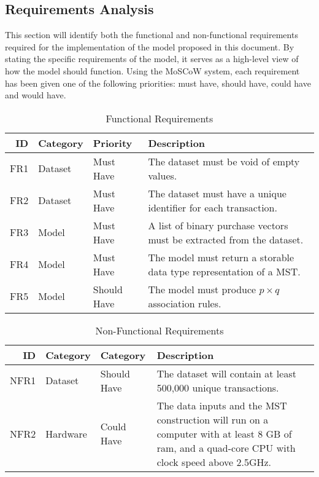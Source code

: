 \documentclass[a4paper,11pt]{article}
\begin{document}
\subsection{Requirements Analysis}
This section will identify both the functional and non-functional requirements required for the implementation of the model proposed in this document. By stating the specific requirements of the model,  it serves as a high-level view of how the model should function. 
 Using the MoSCoW system, each requirement has been given one of the following priorities: must have, should have, could have and would have.
\begin{table}[H]
\centering
\caption{Functional Requirements}
\begin{tabular}{@{}rlll@{}}
\toprule
\textbf{ID} & \textbf{Category} & \textbf{Priority} & \textbf{Description}                                                  \\ \midrule
FR1         & Dataset           & Must Have         & The dataset must be void of empty values.                             \\
FR2         & Dataset           & Must Have         & The dataset must have a unique identifier for each transaction.       \\
FR3         & Model             & Must Have         & A list of binary purchase vectors must be extracted from the dataset. \\
FR4         & Model             & Must Have         & The model must return a storable data type representation of a MST.   \\
FR5         & Model             & Should Have       & The model must produce  $p \times q$ association rules.               \\ \bottomrule
\end{tabular}
\label{tab:fr}
\end{table}

\begin{table}[H]
\centering
\caption{Non-Functional Requirements}
\begin{tabular}{@{}rllp{}@{}}
\toprule
\textbf{ID} & \textbf{Category} & \textbf{Category} & \textbf{Description}                                                                                                                          \\ \midrule
NFR1        & Dataset           & Should Have       & The dataset will contain at least 500,000 unique transactions.                                                                                \\
NFR2        & Hardware          & Could Have        & The data inputs and the MST construction will run on a computer with at least 8 GB of ram, and a quad-core CPU with clock speed above 2.5GHz. \\ \bottomrule
\end{tabular}
\label{nfr}
\end{table}
\end{document}
